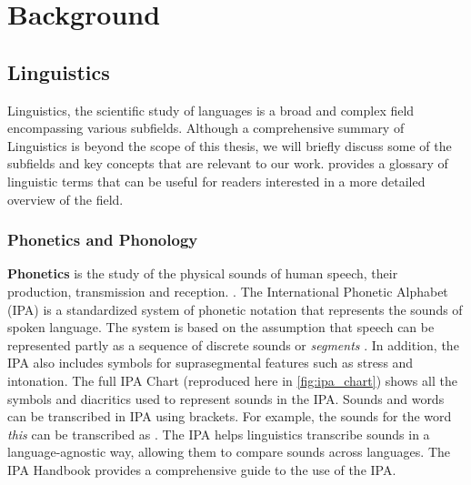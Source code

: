 \chapter{Background}\label{chapter:background}

\section{Linguistics}
Linguistics, the scientific study of languages is a broad and complex field encompassing various subfields. Although a comprehensive summary 
of Linguistics is beyond the scope of this thesis, we will briefly discuss some of the subfields and key concepts that are relevant to our work.
\cite{trask2007language} provides a glossary of linguistic terms that can be useful for readers interested in a more detailed overview of the field.

\subsection{Phonetics and Phonology}
\textbf{Phonetics} is the study of the physical sounds of human speech, their production, transmission and reception. \cite{trask2007language}. The International Phonetic Alphabet (IPA) is a standardized system of phonetic notation that represents the sounds of spoken language. The system
is based on the assumption that speech can be represented partly as a sequence of discrete sounds or \textit{segments} \cite{handbookIPA1999}. 
In addition, the IPA also includes symbols for suprasegmental features such as stress and intonation. The full IPA Chart (reproduced here in 
\ref{fig:ipa_chart}) shows all the symbols and diacritics used to represent sounds in the IPA. Sounds and words can be transcribed in IPA 
using \textipa{[ ]} brackets. For example, the sounds for the word \textit{this} can be transcribed as \textipa{[DIs]}. The IPA helps linguistics
transcribe sounds in a language-agnostic way, allowing them to compare sounds across languages. The IPA Handbook \cite{handbookIPA1999} provides
a comprehensive guide to the use of the IPA.

